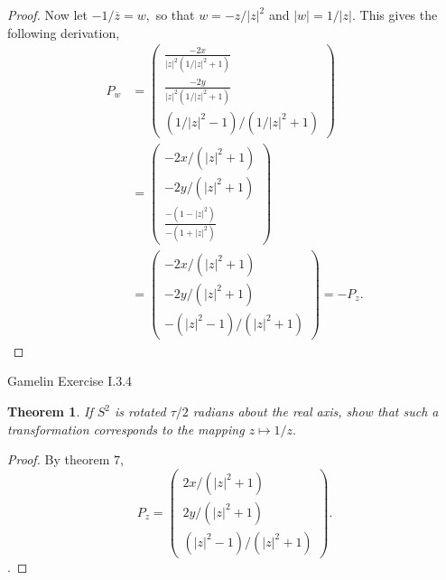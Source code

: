 \documentclass[letter]{article}
\newtheorem{theorem}{Theorem}
\newenvironment{menumerate}{%
  \edef\backupindent{\the\parindent}%
  \enumerate%
  \setlength{\parindent}{\backupindent}%
}{\endenumerate}
\begin{document}
\begin{menumerate}
\begin{proof}
         Now let $-1/\overline{z} = w,$ so that $w = -z/|z|^2$ and $|w| = 1/|z|.$
         This gives the following derivation,
         \begin{equation}
            \begin{aligned}
                         P_w &= \left(
                 \begin{array}{c}
                 \frac{-2x}{|z|^2(1/|z|^2 +1)}\\
                 \frac{-2y}{|z|^2(1/|z|^2+1)}\\
                 (1/|z|^2 -1)/(1/|z|^2 + 1)
                 \end{array}
                 \right) \\
                 &= 
                 \left(
                 \begin{array}{c}
                 -2x/(|z|^2 +1)\\
                -2y/(|z|^2+1)\\
                 \frac{-(1-|z|^2)}{-(1 +|z|^2)}
                 \end{array}
                 \right) \\
                 &= \left(
                \begin{array}{c}
                -2x/(|z|^2 +1)\\
                -2y/(|z|^2+1)\\
                -(|z|^2 -1)/(|z|^2 + 1)
                \end{array}
                \right) = -P_z.    
            \end{aligned}
         \end{equation}
    \end{proof}
    \item Gamelin Exercise I.3.4
    \begin{theorem}
        If $S^2$ is rotated $\tau/2$ radians about the real axis,
         show that such a transformation corresponds to the mapping $z \mapsto 1/z.$
    \end{theorem}
    \begin{proof}
        By theorem $7$, 
        \begin{equation}
         P_z = \left(
        \begin{array}{c}
        2x/(|z|^2 +1)\\
        2y/(|z|^2+1)\\
        (|z|^2 -1)/(|z|^2 + 1)
        \end{array}
        \right).
         \end{equation}.

\end{proof}
\end{menumerate}
\end{document}
